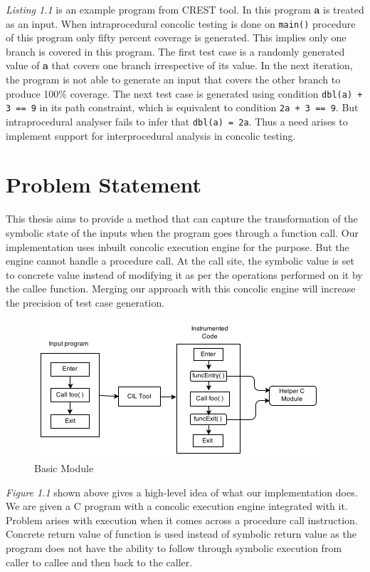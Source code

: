 \documentclass[12pt,oneside]{book}
\begin{document}
\textit{Listing 1.1} is an example program from CREST tool. In this program \textbf{a} is treated as an input. When intraprocedural concolic testing is done on \texttt{main()} procedure of this program only fifty percent coverage is generated. This implies only one branch is covered in this program. The first test case is a randomly generated value of \textbf{a} that covers one branch irrespective of its value. In the next iteration, the program is not able to generate an input that covers the other branch to produce 100\% coverage. The next test case is generated using condition \texttt{dbl(a) + 3 == 9} in its path constraint, which is equivalent to condition \texttt{2a + 3 == 9}. But intraprocedural analyser fails to infer that \texttt{dbl(a) = 2a}. Thus a need arises to implement support for interprocedural analysis in concolic testing.      


\section{Problem Statement}
This thesis aims to provide a method that can capture the transformation of the symbolic state of the inputs when the program goes through a function call. Our implementation uses inbuilt concolic execution engine for the purpose. But the engine cannot handle a procedure call. At the call site, the symbolic value is set to concrete value instead of modifying it as per the operations performed on it by the callee function. Merging our approach with this concolic engine will increase the precision of test case generation. 

\begin{figure}[htbp]
\centering
\includegraphics[scale=1]{module3.png}
\caption{Basic Module}
\end{figure}

\textit{Figure 1.1} shown above gives a high-level idea of what our implementation does. We are given a C program with a concolic execution engine integrated with it. Problem arises with execution when it comes across a procedure call instruction. Concrete return value of function is used instead of symbolic return value as the program does not have the ability to follow through symbolic execution from caller to callee and then back to the caller.
\end{document}

